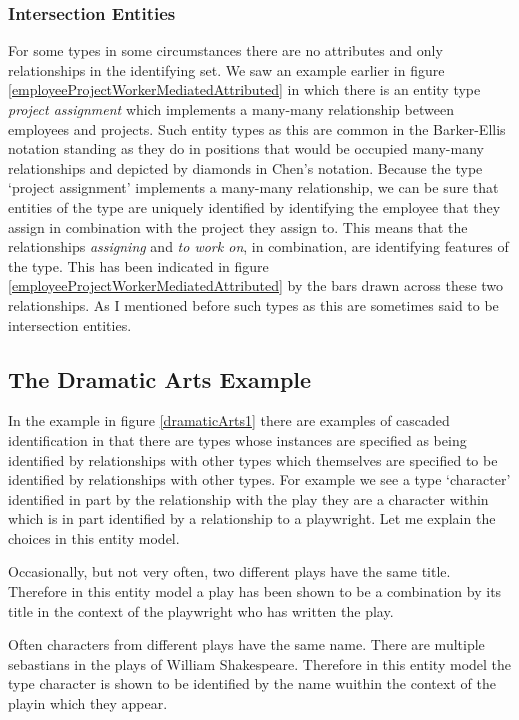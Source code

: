 \subsubsection{Intersection Entities}
\mynote {}
For some types in some circumstances there are no attributes and only relationships in the identifying set. 
We saw an example earlier
in figure \ref{employeeProjectWorkerMediatedAttributed} in  which there is an entity type
\textit{project assignment} which implements a many-many relationship between employees and projects. 
Such entity types as this are common in the Barker-Ellis notation 
standing as they do in positions that would be occupied many-many relationships
 and depicted by  diamonds in Chen's notation. 
 Because the type `project assignment' implements a many-many relationship, we can be sure that entities of the type  are uniquely identified by 
 identifying the employee that they assign in combination with the project they assign to. This means that the relationships \textit{assigning} and \textit{to work on}, in combination, are identifying features of the type. This has been indicated in 
figure  \ref{employeeProjectWorkerMediatedAttributed} by the bars drawn across these two relationships. As I mentioned before such types as this are sometimes said to be intersection entities.


\subsection{The Dramatic Arts Example}
\label{DramaticArtsExample}
In the example in figure \ref{dramaticArts1} there are examples of cascaded identification in that there are types whose instances are specified as being identified by relationships with other types which themselves are specified to be identified by relationships with other types.
For example we see a type `character' identified in part by the relationship with the play they are a character within which is in part identified by a relationship to a playwright. 
Let me explain the choices in this entity model.


Occasionally, but not very often, two different plays have the same title. Therefore in this entity model a play has been shown to be a combination by its title in the context of the playwright who has written the play. 

Often characters from different plays have the same name. There are multiple sebastians in the plays of William Shakespeare. Therefore in this entity model the type character is shown to be identified by the name wuithin the context of the playin which they appear.

